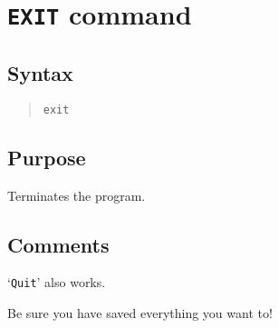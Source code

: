 %
%
%
%
\section{{\tt EXIT} command}
\subsection{Syntax}
\begin{verse}
{\tt exit}
\end{verse}
\subsection{Purpose}

Terminates the program.
\subsection{Comments}

`{\tt Quit}' also works.

Be sure you have saved everything you want to!
